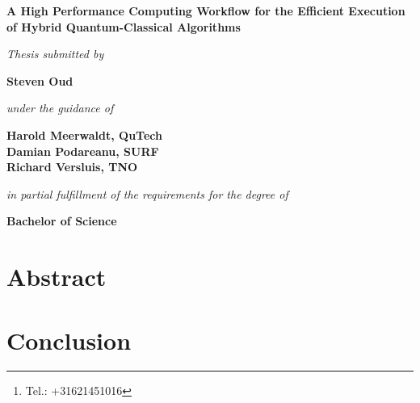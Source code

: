 \documentclass[a4paper,11pt]{report}
\title{\thesistitle}
\author{\authorname\thanks{Tel.: +31621451016}\\
    500776959\\
    \\
    \emph{Faculty of Computer Science, Information Technology,}\\
    \emph{Business IT and Management}\\
    Software Engineering
    \\
    \\
    \\
    Advisor: Marten Teitsma
    \\
    \\
    \\
    Amsterdam University of Applied Sciences\\
    \today}
\date{}
\renewcommand{\thefootnote}{\fnsymbol{footnote}}
\newcommand{\thesistitle}{A High Performance Computing Workflow for the Efficient Execution of Hybrid Quantum-Classical Algorithms}
\newcommand{\authorname}{Steven Oud}
\begin{document}
\begin{titlepage}
\thispagestyle{empty}
    \begin{center}
        \vspace*{1cm}
        \textbf{\LARGE \thesistitle}
        
        \vspace{1.5cm}
        \textit{\large Thesis submitted by}

        \vspace{0.75cm}
        
        \textbf{\large \authorname}
        
        \vspace{0.75cm}
        \textit{\large under the guidance of}
        
        \vspace{0.75cm}
        \textbf{\large Harold Meerwaldt, QuTech\\
            Damian Podareanu, SURF\\
            Richard Versluis, TNO}
        
        \vspace{0.75cm}
        \textit{\large in partial fulfillment of the requirements for the degree of}
        
        \vspace{0.75cm}
        \textbf{\large Bachelor of Science}
        
    \end{center}
\end{titlepage}

\maketitle

\renewcommand{\thefootnote}{\arabic{footnote}}

\chapter*{Abstract}
\lipsum[5]

\cleardoublepage
\tableofcontents

\cleardoublepage
\listoffigures

\cleardoublepage
\listoftables

\cleardoublepage
{}









\chapter{Conclusion}

\cleardoublepage
\printbibliography[heading=bibintoc]

\cleardoublepage
\printnoidxglossaries

\begin{appendices}
\appendix

\end{appendices}
\end{document}
